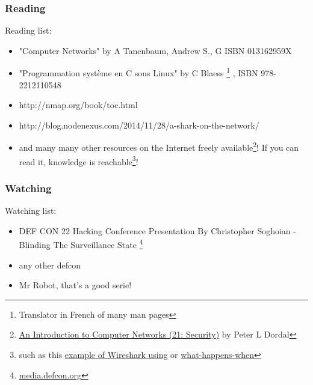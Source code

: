   \begin{frame}
    \frametitle{Reading}
    \begin{block}{Reading list:}
      \begin{itemize}
        \item "Computer Networks" by A Tanenbaum, Andrew S., G ISBN 013162959X
        \item "Programmation système en C sous Linux" by C Blaess \footnote{Translator in French of many man pages} , ISBN 978-2212110548
        \item http://nmap.org/book/toc.html
        \item http://blog.nodenexus.com/2014/11/28/a-shark-on-the-network/
        \item and many many other resources on the Internet freely available\footnote{{\color{blue}\href{http://intronetworks.cs.luc.edu/current/ComputerNetworks.pdf}{An Introduction to Computer Networks (21: Security)}} by Peter L Dordal}! If you can read it, knowledge is reachable\footnote{such as this {\color{blue}\href{https://silverskylabs.github.io/yakhak/}{example of Wireshark using}} or {\color{blue}\href{https://github.com/alex/what-happens-when}{what-happens-when}}}!
      \end{itemize}
    \end{block}
  \end{frame}

  \begin{frame}
    \frametitle{Watching}
    \begin{block}{Watching list:}
      \begin{itemize}
        \item DEF CON 22 Hacking Conference Presentation By Christopher Soghoian - Blinding The Surveillance State
        \footnote{{\color{blue}\href{https://media.defcon.org/DEF CON 22/DEF CON 22 video and slides/}{media.defcon.org}}}
        \item any other defcon
        \item Mr Robot, that's a good serie!
      \end{itemize}
    \end{block}
  \end{frame}
